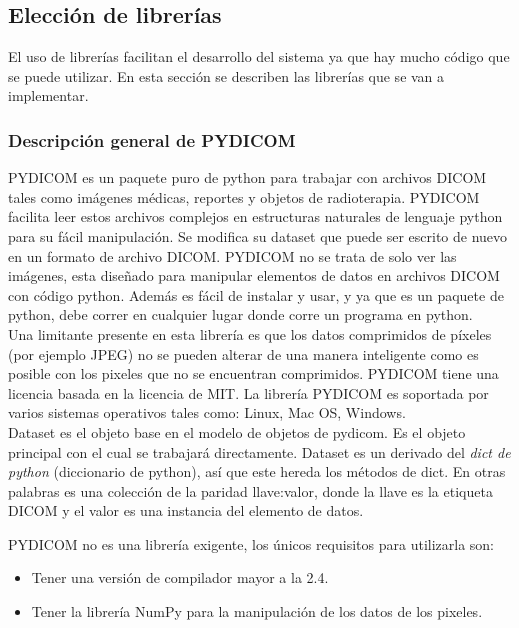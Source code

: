 \documentclass[12pt]{report}
\begin{document}
\subsection{Elección de librerías}
El uso de librerías facilitan el desarrollo del sistema ya que hay mucho código que se puede utilizar. En esta sección se describen las librerías que se van a implementar.

\subsubsection{Descripción general de PYDICOM}
PYDICOM es un paquete puro de python para trabajar con archivos DICOM tales como imágenes médicas, reportes y objetos de radioterapia. PYDICOM facilita leer estos archivos complejos en estructuras naturales de lenguaje python para su fácil manipulación. Se modifica su dataset que puede ser escrito de nuevo en un formato de archivo DICOM. PYDICOM no se trata de solo ver las imágenes, esta diseñado para manipular elementos de datos en archivos DICOM con código python. Además es fácil de instalar y usar, y ya que es un paquete de python, debe correr en cualquier lugar donde corre un programa en python.\\

Una limitante presente en esta librería es que los datos comprimidos de píxeles (por ejemplo JPEG) no se pueden alterar de una manera inteligente como es posible con los pixeles que no se encuentran comprimidos. PYDICOM tiene una licencia basada en la licencia de MIT. La librería PYDICOM es soportada por varios sistemas operativos tales como: Linux, Mac OS, Windows.\cite{pydi}\\

Dataset es el objeto base en el modelo de objetos de pydicom. Es el objeto principal con el cual se trabajará directamente. Dataset es un derivado del \textit{dict de python} (diccionario de python), así que este hereda los métodos de dict. En otras palabras es una colección de la paridad llave:valor, donde la llave es la etiqueta DICOM y el valor es una instancia del elemento de datos.\cite{pydi}

PYDICOM no es una librería exigente, los únicos requisitos para utilizarla son:
\begin{itemize}
\item Tener una versión de compilador mayor a la 2.4.
\item Tener la librería NumPy para la manipulación de los datos de los pixeles.
\end{itemize}
\end{document}
